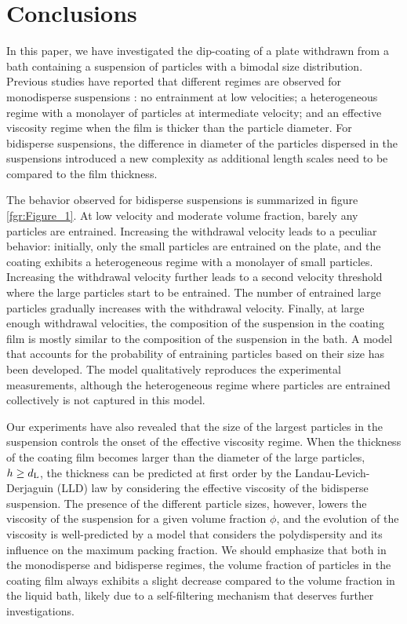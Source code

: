 \documentclass{jfm}
\begin{document}
\section{Conclusions}

In this paper, we have investigated the dip-coating of a plate withdrawn from a bath containing a suspension of particles with a bimodal size distribution. Previous studies have reported that different regimes are observed for monodisperse suspensions \cite[][]{sauret2019capillary,palma2019dip}: no entrainment at low velocities; a heterogeneous regime with a monolayer of particles at intermediate velocity; and an effective viscosity regime when the film is thicker than the particle diameter. For bidisperse suspensions, the difference in diameter of the particles dispersed in the suspensions introduced a new complexity as additional length scales need to be compared to the film thickness. 

The behavior observed for bidisperse suspensions is summarized in figure \ref{fgr:Figure_1}. At low velocity and moderate volume fraction, barely any particles are entrained. Increasing the withdrawal velocity leads to a peculiar behavior: initially, only the small particles are entrained on the plate, and the coating exhibits a heterogeneous regime with a monolayer of small particles. Increasing the withdrawal velocity further leads to a second velocity threshold where the large particles start to be entrained. The number of entrained large particles gradually increases with the withdrawal velocity. Finally, at large enough withdrawal velocities, the composition of the suspension in the coating film is mostly similar to the composition of the suspension in the bath. A model that accounts for the probability of entraining particles based on their size has been developed. The model qualitatively reproduces the experimental measurements, although the heterogeneous regime where particles are entrained collectively is not captured in this model. 

Our experiments have also revealed that the size of the largest particles in the suspension controls the onset of the effective viscosity regime. When the thickness of the coating film becomes larger than the diameter of the large particles, $h \geq d_{\rm L}$, the thickness can be predicted at first order by the Landau-Levich-Derjaguin (LLD) law by considering the effective viscosity of the bidisperse suspension. The presence of the different particle sizes, however, lowers the viscosity of the suspension for a given volume fraction $\phi$, and the evolution of the viscosity is well-predicted by a model that considers the polydispersity and its influence on the maximum packing fraction. We should emphasize that both in the monodisperse and bidisperse regimes, the volume fraction of particles in the coating film always exhibits a slight decrease compared to the volume fraction in the liquid bath, likely due to a self-filtering mechanism that deserves further investigations.
\end{document}
